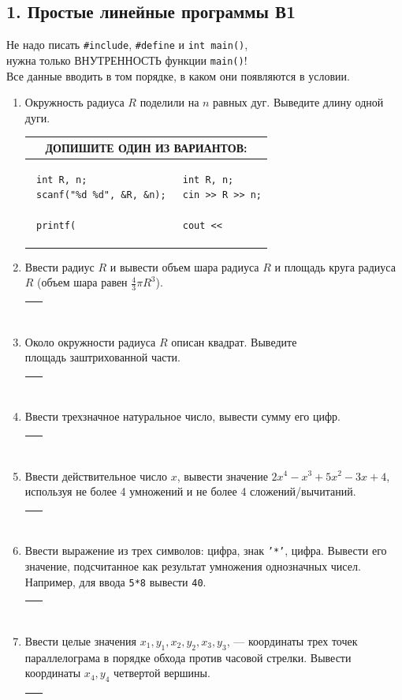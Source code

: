 \documentclass{article}
\newcommand{\answerbox}[1][1.7cm]{\par\begin{tabular}{|p{.92\textwidth}|}
 \hline
 ~\linebreak\vskip#1\mbox{}
 \\
 \hline
\end{tabular}}
\begin{document}
\pagestyle{empty}
\abovedisplayskip=0pt

\subsection*{1. Простые линейные программы \hfill В1}

Не надо писать \texttt{\#include}, \texttt{\#define} и \texttt{int main()}, \\нужна только ВНУТРЕННОСТЬ функции \texttt{main()}! \\Все данные вводить в том порядке, в каком они появляются в условии.

\begin{enumerate}[left=0pt .. \parindent]
\item
Окружность радиуса $R$ поделили на $n$ равных дуг. Выведите длину одной дуги.
\\
\setlength\partopsep{-\topsep}
\begin{tabular}{|p{}@{}|@{}p{}|}
\hline
\multicolumn{2}{|c|}{ДОПИШИТЕ ОДИН ИЗ ВАРИАНТОВ:}
\\
\hline
 \begin{verbatim}
 int R, n;
 scanf("%d %d", &R, &n);
 
 printf( 
 \end{verbatim}
&
 \begin{verbatim}
 int R, n;
 cin >> R >> n;

 cout << 
 \end{verbatim}
\\
\hline
\end{tabular}
\item
Ввести радиус $R$ и вывести объем шара радиуса $R$ и площадь круга радиуса $R$ (объем шара равен $\frac{4}{3}\pi R^3$).
\answerbox
\item
Около окружности радиуса $R$ описан квадрат. Выведите \hfill{}\\
площадь заштрихованной части.\\[1mm]
\answerbox
\item
Ввести трехзначное натуральное число, вывести сумму его цифр.
\answerbox
\item
Ввести действительное число $x$, вывести значение $2x^4-x^3+5x^2-3x+4$, используя не более 4 умножений и не более 4 сложений/вычитаний.
\answerbox
\item
Ввести выражение из трех символов: цифра, знак \texttt{'*'}, цифра. Вывести его значение, подсчитанное как результат умножения однозначных чисел. Например, для ввода \texttt{5*8} вывести \texttt{40}.
\answerbox
\item
Ввести целые значения $x_1, y_1, x_2, y_2, x_3, y_3$, --- координаты трех точек параллелограма в порядке обхода против часовой стрелки. Вывести координаты $x_4, y_4$ четвертой вершины.
\answerbox[7cm]
\end{enumerate}

	
\end{document}
